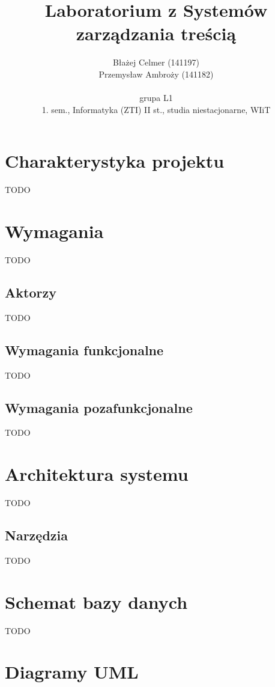 \documentclass[polish,polish,a4paper]{article}
\title{Laboratorium z Systemów zarządzania treścią}
\author{
    Błażej Celmer (141197)\\
    Przemysław Ambroży (141182)\\\\
    grupa L1\\
    1. sem., Informatyka (ZTI) II st., studia niestacjonarne, WIiT
}
\begin{document}
\maketitle

\newpage

\tableofcontents

\newpage

\section{Charakterystyka projektu}

TODO

\section{Wymagania}

TODO

\subsection{Aktorzy}

TODO

\subsection{Wymagania funkcjonalne}

TODO

\subsection{Wymagania pozafunkcjonalne}

TODO

\section{Architektura systemu}

TODO

\subsection{Narzędzia}

TODO

\section{Schemat bazy danych}

TODO

\section{Diagramy UML}
\end{document}
